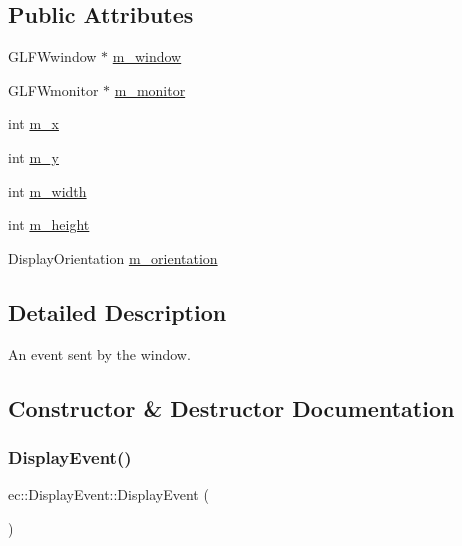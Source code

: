 \subsection*{Public Attributes}
\begin{DoxyCompactItemize}
\item 
G\+L\+F\+Wwindow $\ast$ \mbox{\hyperlink{structec_1_1_display_event_a501ab5209368544f1c264b3e25a87185}{m\+\_\+window}}
\item 
G\+L\+F\+Wmonitor $\ast$ \mbox{\hyperlink{structec_1_1_display_event_a2c3ae8a32b9c575f1f567eb3a89985cc}{m\+\_\+monitor}}
\item 
int \mbox{\hyperlink{structec_1_1_display_event_a35b371c7098cc98509f44e6fe2802945}{m\+\_\+x}}
\item 
int \mbox{\hyperlink{structec_1_1_display_event_aa4314e0538f9929b39e37bb400ac2220}{m\+\_\+y}}
\item 
int \mbox{\hyperlink{structec_1_1_display_event_ab14060df4b5ea8295712b58fce89a93a}{m\+\_\+width}}
\item 
int \mbox{\hyperlink{structec_1_1_display_event_a395871be035f491d8e894b7cacc609ba}{m\+\_\+height}}
\item 
Display\+Orientation \mbox{\hyperlink{structec_1_1_display_event_a3d155441337a15fd45aa3584168da059}{m\+\_\+orientation}}
\end{DoxyCompactItemize}


\subsection{Detailed Description}
An event sent by the window. 

\subsection{Constructor \& Destructor Documentation}
\mbox{\label{structec_1_1_display_event_a34ed8f096607ab02657e3599cd3d3211}} 
\subsubsection{\texorpdfstring{Display\+Event()}{DisplayEvent()}\hspace{0.1cm}{\footnotesize\ttfamily [1/2]}}
{\footnotesize\ttfamily ec\+::\+Display\+Event\+::\+Display\+Event (\begin{DoxyParamCaption}{ }\end{DoxyParamCaption})\hspace{0.3cm}{\ttfamily [explicit]}}

